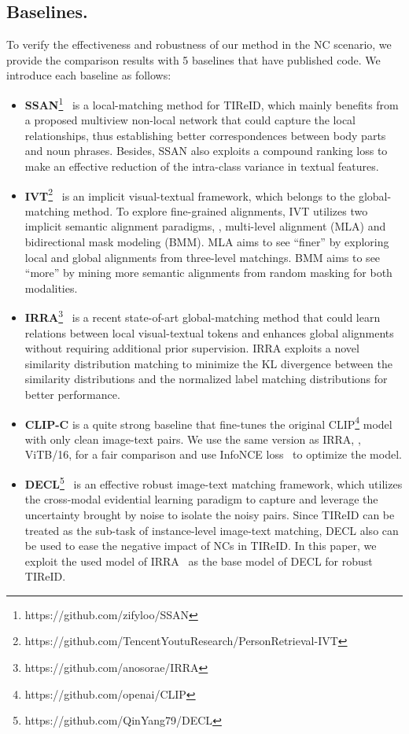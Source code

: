 \documentclass[10pt,twocolumn,letterpaper]{article}
\begin{document}
\subsection{Baselines.} To verify the effectiveness and robustness of our method in the NC scenario, we provide the comparison results with 5 baselines that have published code. We introduce each baseline as follows:
\begin{itemize}
    \item \textbf{SSAN}\footnote{https://github.com/zifyloo/SSAN}~\cite{ding2021semantically} is a local-matching method for TIReID, which mainly benefits from a proposed multiview non-local network that could capture the local relationships, thus establishing better correspondences between body parts and noun phrases. Besides, SSAN also exploits a compound ranking loss to make an effective reduction of the intra-class variance in textual features.
    \item \textbf{IVT}\footnote{https://github.com/TencentYoutuResearch/PersonRetrieval-IVT}~\cite{shu2022see} is an implicit visual-textual framework, which belongs to the global-matching method. To explore fine-grained alignments, IVT utilizes two implicit semantic alignment paradigms, \ie, multi-level alignment (MLA) and bidirectional mask modeling (BMM). MLA aims to see “finer” by exploring local and global alignments from three-level matchings. BMM aims to see “more” by mining more semantic alignments from random masking for both modalities.
    \item \textbf{IRRA}\footnote{https://github.com/anosorae/IRRA}~\cite{jiang2023cross} is a recent state-of-art global-matching method that could learn relations between local visual-textual tokens and enhances global alignments without requiring additional prior supervision. IRRA exploits a novel similarity distribution matching to minimize the KL divergence between the similarity distributions and the normalized label matching distributions for better performance.
    \item \textbf{CLIP-C} is a quite strong baseline that fine-tunes the original CLIP\footnote{https://github.com/openai/CLIP} model with only clean image-text pairs. We use the same version as IRRA, \ie, ViTB/16, for a fair comparison and use InfoNCE loss~\cite{oord2018representation} to optimize the model.
    \item \textbf{DECL}\footnote{https://github.com/QinYang79/DECL}~\cite{qin2022deep} is an effective robust image-text matching framework, which utilizes the cross-modal evidential learning paradigm to capture and leverage the uncertainty brought by noise to isolate the noisy pairs. Since TIReID can be treated as the sub-task of instance-level image-text matching, DECL also can be used to ease the negative impact of NCs in TIReID. In this paper, we exploit the used model of IRRA~\cite{jiang2023cross} as the base model of DECL for robust TIReID. 
\end{itemize}
\end{document}
